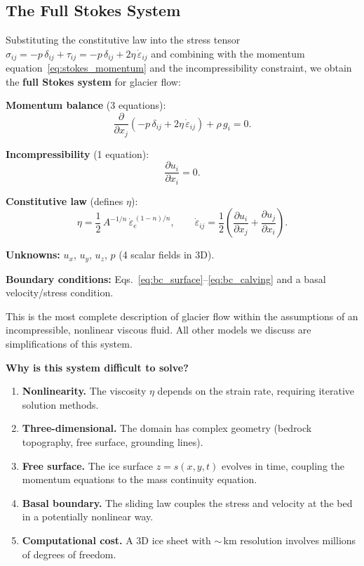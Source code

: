 \documentclass[11pt]{article}
\begin{document}
\subsection{The Full Stokes System}
\label{sec:full_stokes}

Substituting the constitutive law into the stress tensor $\sigma_{ij} = -p\,\delta_{ij} + \tau_{ij} = -p\,\delta_{ij} + 2\eta\,\dot{\varepsilon}_{ij}$ and combining with the momentum equation~\eqref{eq:stokes_momentum} and the incompressibility constraint, we obtain the \textbf{full Stokes system} for glacier flow:

\begin{tcolorbox}[
  colback=green!5,
  colframe=green!50!black,
  title={\textbf{The Full Stokes System}},
  breakable
]
\textbf{Momentum balance} (3 equations):
\begin{equation}
  \frac{\partial}{\partial x_j}\left(-p\,\delta_{ij} + 2\eta\,\dot{\varepsilon}_{ij}\right) + \rho\,g_i = 0.
  \label{eq:stokes_full}
\end{equation}

\textbf{Incompressibility} (1 equation):
\begin{equation}
  \frac{\partial u_i}{\partial x_i} = 0.
  \label{eq:incompressibility}
\end{equation}

\textbf{Constitutive law} (defines $\eta$):
\begin{equation}
  \eta = \frac{1}{2}\,A^{-1/n}\,\dot{\varepsilon}_e^{\,(1-n)/n}, \qquad
  \dot{\varepsilon}_{ij} = \frac{1}{2}\left(\frac{\partial u_i}{\partial x_j} + \frac{\partial u_j}{\partial x_i}\right).
\end{equation}

\textbf{Unknowns:} $u_x$, $u_y$, $u_z$, $p$ (4 scalar fields in 3D).

\textbf{Boundary conditions:} Eqs.~\eqref{eq:bc_surface}--\eqref{eq:bc_calving} and a basal velocity/stress condition.
\end{tcolorbox}

\noindent This is the most complete description of glacier flow within the assumptions of an incompressible, nonlinear viscous fluid.  All other models we discuss are simplifications of this system.

\medskip
\noindent\textbf{Why is this system difficult to solve?}
\begin{enumerate}[nosep]
  \item \textbf{Nonlinearity.}  The viscosity $\eta$ depends on the strain rate, requiring iterative solution methods.
  \item \textbf{Three-dimensional.}  The domain has complex geometry (bedrock topography, free surface, grounding lines).
  \item \textbf{Free surface.}  The ice surface $z = s(x,y,t)$ evolves in time, coupling the momentum equations to the mass continuity equation.
  \item \textbf{Basal boundary.}  The sliding law couples the stress and velocity at the bed in a potentially nonlinear way.
  \item \textbf{Computational cost.}  A 3D ice sheet with $\sim$\,km resolution involves millions of degrees of freedom.
\end{enumerate}
\end{document}
